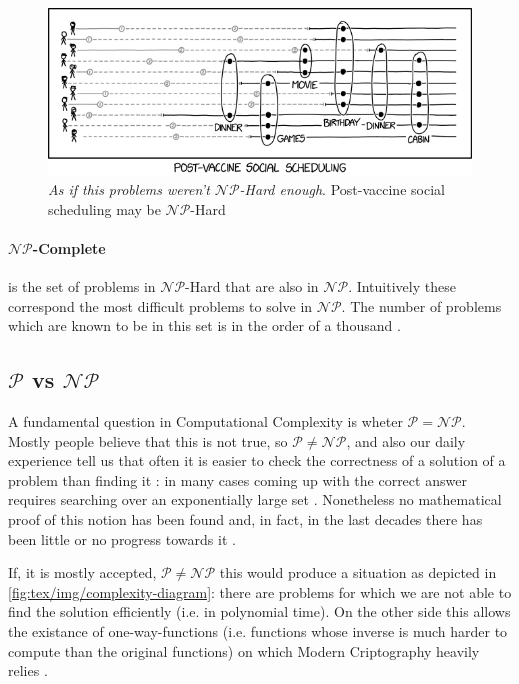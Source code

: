 \begin{figure}[]
	\centering
	\includegraphics[width=0.8\linewidth]{tex/img/post_vaccine_social_scheduling.png}
	\caption{\emph{As if this problems weren't $\mathcal{NP} $-Hard enough}.
		Post-vaccine social scheduling may be $\mathcal{NP} $-Hard \cite{Munroe}}%
	\label{fig:tex/img/post_vaccine_social_scheduling}
\end{figure}

\paragraph{$\mathcal{NP} $-Complete}%
\label{par:_np_hard} is the set of problems in $\mathcal{NP} $-Hard that are
also in $\mathcal{NP} $. Intuitively these correspond the most difficult
problems to solve in $\mathcal{NP} $. The number of problems which are known to
be in this set is in the order of a thousand \cite{SanjeevArora2017}.

\subsection{$\mathcal{P} $ vs $\mathcal{NP}$}%
\label{sub:_p_vs_np_}

A fundamental question in Computational Complexity is wheter $\mathcal{P} =
	\mathcal{NP} $. Mostly people believe that this is not true, so
$\mathcal{P} \neq \mathcal{NP} $, and also our daily experience tell us that
often it is easier to check the correctness of a solution of a problem than
finding it \cite{9780521884730}: in many cases coming up with the correct
answer requires searching over an exponentially large set
\cite{SanjeevArora2017}. Nonetheless no mathematical proof of this notion has
been found and, in fact, in the last decades there has been little or no progress towards it \cite{Erickson2019}.

If, it is mostly accepted, $\mathcal{P} \neq \mathcal{NP} $ this would produce
a situation as depicted in \autoref{fig:tex/img/complexity-diagram}:
there are problems for which we are not able to find the solution
efficiently (i.e. in polynomial time). On the other side this allows the
existance of one-way-functions (i.e. functions whose inverse is much harder to
compute than the original functions) on which Modern Criptography heavily
relies \cite{9780521884730}.
%

